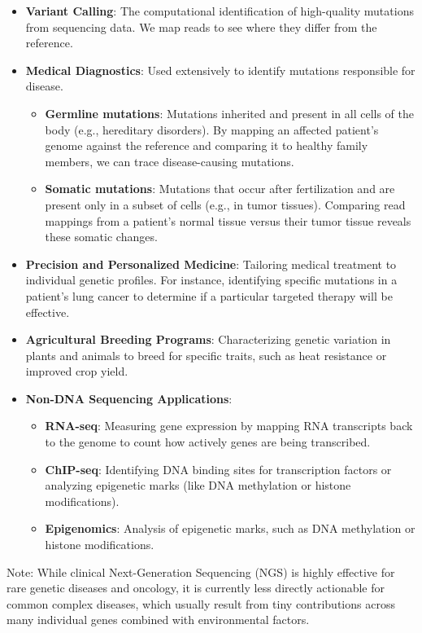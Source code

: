 \begin{itemize}
    \item \textbf{Variant Calling}: The computational identification of high-quality mutations from sequencing data. We map reads to see where they differ from the reference.
    \item \textbf{Medical Diagnostics}: Used extensively to identify mutations responsible for disease.
    \begin{itemize}
        \item \textbf{Germline mutations}: Mutations inherited and present in all cells of the body (e.g., hereditary disorders). By mapping an affected patient's genome against the reference and comparing it to healthy family members, we can trace disease-causing mutations.
        \item \textbf{Somatic mutations}: Mutations that occur after fertilization and are present only in a subset of cells (e.g., in tumor tissues). Comparing read mappings from a patient's normal tissue versus their tumor tissue reveals these somatic changes.
    \end{itemize}
    \item \textbf{Precision and Personalized Medicine}: Tailoring medical treatment to individual genetic profiles. For instance, identifying specific mutations in a patient's lung cancer to determine if a particular targeted therapy will be effective.
    \item \textbf{Agricultural Breeding Programs}: Characterizing genetic variation in plants and animals to breed for specific traits, such as heat resistance or improved crop yield.
    \item \textbf{Non-DNA Sequencing Applications}:
    \begin{itemize}
        \item \textbf{RNA-seq}: Measuring gene expression by mapping RNA transcripts back to the genome to count how actively genes are being transcribed.
        \item \textbf{ChIP-seq}: Identifying DNA binding sites for transcription factors or analyzing epigenetic marks (like DNA methylation or histone modifications).
        \item \textbf{Epigenomics}: Analysis of epigenetic marks, such as DNA methylation or histone modifications.
    \end{itemize}
\end{itemize}

\sta Note: While clinical Next-Generation Sequencing (NGS) is highly effective for rare genetic diseases and oncology, it is currently less directly actionable for common complex diseases, which usually result from tiny contributions across many individual genes combined with environmental factors.

